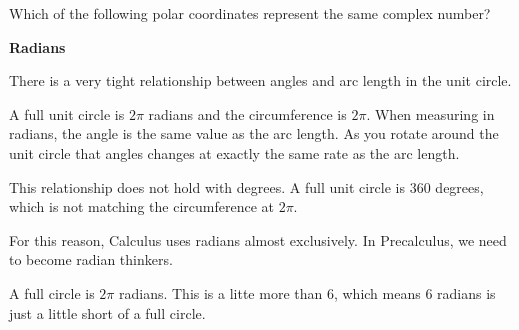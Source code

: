 \documentclass{ximera}
\begin{document}
\begin{image}
  \end{image}








\begin{question}
Which of the following polar coordinates represent the same complex number?
\begin{selectAll}
\end{selectAll}
\end{question}








\begin{warning} \textbf{\textcolor{red!80!black}{Radians}}


There is a very tight relationship between angles and arc length in the unit circle. 


A full unit circle is $2\pi$ radians and the circumference is $2\pi$. When measuring in radians, the angle is the same value as the arc length.  As you rotate around the unit circle that angles changes at exactly the same rate as the arc length. 

This relationship does not hold with degrees. A full unit circle is $360$ degrees, which is not matching  the circumference at $2\pi$. 


For this reason, Calculus uses radians almost exclusively.  In Precalculus, we need to become radian thinkers.





\end{warning}






A full circle is $2\pi$ radians. This is a litte more than $6$, which means $6$ radians is just a little short of a full circle.
\end{document}
